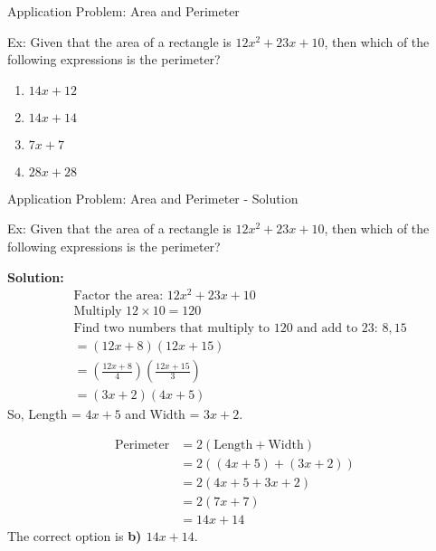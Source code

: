 \documentclass[aspectratio=169]{beamer}
\begin{document}
\begin{frame}{Application Problem: Area and Perimeter}
    \begin{tcolorbox}[colback=lightgray,colframe=primary,title=Area and Perimeter Application]
        \footnotesize
        Ex: Given that the area of a rectangle is $12x^2 + 23x + 10$, then which of the following expressions is the perimeter?
        \begin{enumerate}
            \item $14x + 12$
            \item $14x + 14$
            \item $7x + 7$
            \item $28x + 28$
        \end{enumerate}
    \end{tcolorbox}
\end{frame}

\begin{frame}{Application Problem: Area and Perimeter - Solution}
    \begin{tcolorbox}[colback=lightgray,colframe=accent,title=Detailed Solution]
        \footnotesize
        Ex: Given that the area of a rectangle is $12x^2 + 23x + 10$, then which of the following expressions is the perimeter?
        
        \textbf{Solution:}
        \begin{align*}
            & \text{Factor the area: } 12x^2 + 23x + 10 \\
            & \text{Multiply } 12 \times 10 = 120 \\
            & \text{Find two numbers that multiply to 120 and add to 23: } 8, 15 \\
            &= (12x + 8)(12x + 15) \\
            &= \left(\frac{12x + 8}{4}\right)\left(\frac{12x + 15}{3}\right) \\
            &= (3x + 2)(4x + 5)
        \end{align*}
        So, Length = $4x + 5$ and Width = $3x + 2$.
        
        \begin{align*}
            \text{Perimeter} &= 2(\text{Length} + \text{Width}) \\
            &= 2((4x + 5) + (3x + 2)) \\
            &= 2(4x + 5 + 3x + 2) \\
            &= 2(7x + 7) \\
            &= 14x + 14
        \end{align*}
        The correct option is \textbf{b) $14x + 14$}.
    \end{tcolorbox}
\end{frame}
\end{document}
